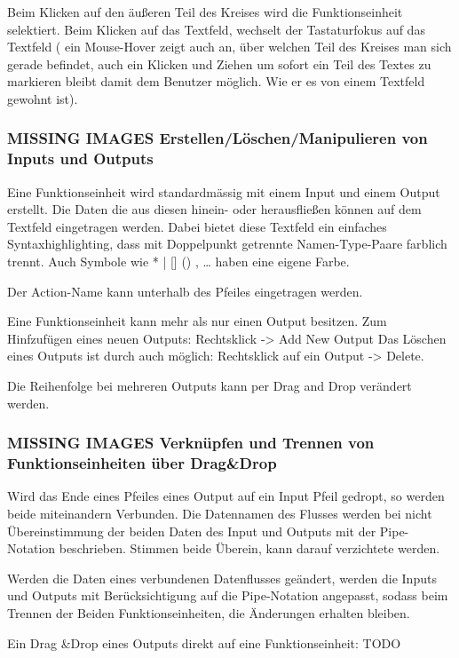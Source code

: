 	Beim Klicken auf den äußeren Teil des Kreises wird die Funktionseinheit
	selektiert. Beim Klicken auf das Textfeld, wechselt der Tastaturfokus auf
	das Textfeld ( ein Mouse-Hover zeigt auch an, über welchen Teil des Kreises
	man sich gerade befindet, auch ein Klicken und Ziehen um sofort ein Teil
	des Textes zu markieren bleibt damit dem Benutzer möglich. Wie er es von
	einem Textfeld gewohnt ist).
	
	
\subsubsection{	 MISSING IMAGES Erstellen/Löschen/Manipulieren von Inputs und Outputs}

	Eine Funktionseinheit wird standardmässig mit einem Input und einem Output
	erstellt. Die Daten die aus diesen hinein- oder herausfließen können auf
	dem Textfeld eingetragen werden. Dabei bietet diese Textfeld ein einfaches
	Syntaxhighlighting, dass mit Doppelpunkt getrennte Namen-Type-Paare
	farblich trennt. Auch Symbole wie * | [] () , \ldots{} haben eine eigene Farbe.
	
	Der Action-Name kann unterhalb des Pfeiles eingetragen werden.
	
	Eine Funktionseinheit kann mehr als nur einen Output besitzen.
	Zum Hinfzufügen eines neuen Outputs: Rechtsklick -> Add New Output
	Das Löschen eines Outputs ist durch auch möglich: Rechtsklick auf ein
	Output -> Delete.    
	
	Die Reihenfolge bei mehreren Outputs kann per Drag and Drop verändert werden.
	
\subsubsection{MISSING IMAGES Verknüpfen und Trennen von Funktionseinheiten über Drag\&Drop }

	Wird das Ende eines Pfeiles eines Output auf ein Input Pfeil gedropt, so werden beide
	miteinandern Verbunden. Die Datennamen des Flusses werden bei nicht
	Übereinstimmung der beiden Daten des Input und Outputs mit
	der Pipe-Notation beschrieben. Stimmen beide Überein, kann darauf
	verzichtete werden.
	
	Werden die Daten eines verbundenen Datenflusses geändert, werden die Inputs
	und Outputs mit Berücksichtigung auf die Pipe-Notation angepasst, sodass
	beim Trennen der Beiden Funktionseinheiten, die Änderungen erhalten bleiben.
	
	Ein Drag \&Drop eines Outputs direkt auf eine Funktionseinheit: TODO
	
